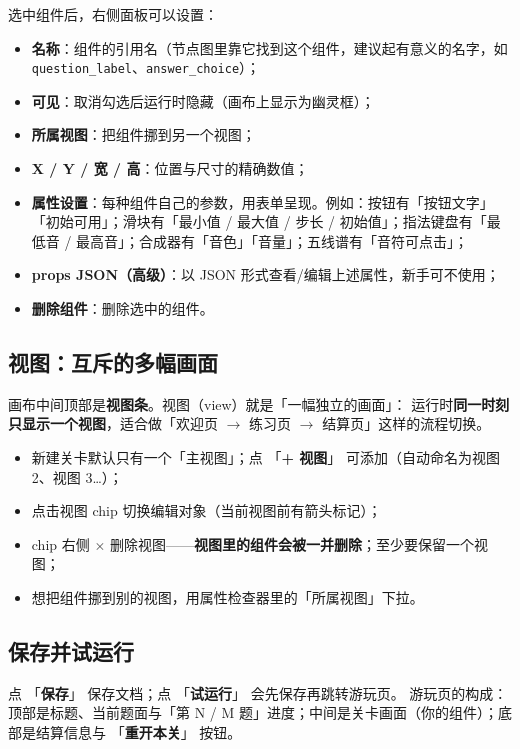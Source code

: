 \documentclass[UTF8,a4paper,zihao=-4]{ctexart}
\newcommand{\code}[1]{\texttt{#1}}   %
\newcommand{\ui}[1]{「\textbf{#1}」}  %
\begin{document}
选中组件后，右侧面板可以设置：

\begin{itemize}[nosep]
  \item \textbf{名称}：组件的引用名（节点图里靠它找到这个组件，建议起有意义的名字，如 \code{question\_label}、\code{answer\_choice}）；
  \item \textbf{可见}：取消勾选后运行时隐藏（画布上显示为幽灵框）；
  \item \textbf{所属视图}：把组件挪到另一个视图；
  \item \textbf{X / Y / 宽 / 高}：位置与尺寸的精确数值；
  \item \textbf{属性设置}：每种组件自己的参数，用表单呈现。例如：按钮有「按钮文字」「初始可用」；滑块有「最小值 / 最大值 / 步长 / 初始值」；指法键盘有「最低音 / 最高音」；合成器有「音色」「音量」；五线谱有「音符可点击」；
  \item \textbf{props JSON（高级）}：以 JSON 形式查看/编辑上述属性，新手可不使用；
  \item \textbf{删除组件}：删除选中的组件。
\end{itemize}

\subsection{视图：互斥的多幅画面}

画布中间顶部是\textbf{视图条}。视图（view）就是「一幅独立的画面」：
运行时\textbf{同一时刻只显示一个视图}，适合做「欢迎页 $\rightarrow$ 练习页 $\rightarrow$ 结算页」这样的流程切换。

\begin{itemize}[nosep]
  \item 新建关卡默认只有一个「主视图」；点 \ui{+ 视图} 可添加（自动命名为视图 2、视图 3\ldots）；
  \item 点击视图 chip 切换编辑对象（当前视图前有箭头标记）；
  \item chip 右侧 $\times$ 删除视图——\textbf{视图里的组件会被一并删除}；至少要保留一个视图；
  \item 想把组件挪到别的视图，用属性检查器里的「所属视图」下拉。
\end{itemize}

\subsection{保存并试运行}

点 \ui{保存} 保存文档；点 \ui{试运行} 会先保存再跳转游玩页。
游玩页的构成：顶部是标题、当前题面与「第 N / M 题」进度；中间是关卡画面（你的组件）；底部是结算信息与 \ui{重开本关} 按钮。
\end{document}
